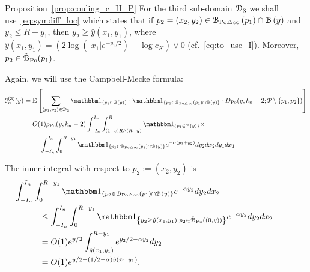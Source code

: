 \begin{proofof}{Proposition~\ref{prop:couling_c_H_P}}
For the third sub-domain $\mathcal{D}_{3}$ we shall use~\eqref{eq:symdiff_loc} which states that if 
$p_2=(x_2,y_2) \in {\mathcal B}_{{\mathrm{Po}} \bigtriangleup \infty}\left(p_1\right)\cap {\mathcal B}\left(y\right)$ and $y_2\leq R - y_1$, then 
$y_2 \geq \hat{y}(x_1,y_1)$, where $\hat{y}(x_1,y_1) = \left(2 \log(|x_1|e^{-y_1/2}) - \log c_K \right) \vee 0$ (cf.~\eqref{eq:to_use_I}). Moreover, $p_2 \in \check{{\mathcal B}}_{{\mathrm{Po}}}(p_1)$.


Again, we will use the Campbell-Mecke formula: 
\begin{align*}
	\mathcal{I}_n^{(3)}(y) &= \Exp { \sum_{(p_1,p_2)  \in \dom{3}} 
		\ind{p_1 \in \BallHyp{y}} \cdot \ind{p_2 \in \BallSym{p_1} \cap \BallHyp{y}}
		\cdot D_{\Po} (y,k_n-2;\Pcal \setminus \{ p_1, p_2\})} \\
	&= O(1) \rho_{\Po}(y,k_n-2) \int_{-I_n}^{I_n} \int_{(1-\eps) R \wedge (R-y)}^{R} \ind{p_1 \in \BallHyp{y}}
		\times\\
	&\hspace{25pt} \int_{-I_n}^{I_n} \int_{0}^{R-y_1} 
		\ind{p_2 \in \BallSym{p_1} \cap \BallHyp{y}} 
		e^{-\alpha(y_1 + y_2)} dy_2 dx_2 dy_1 dx_1 \\
\end{align*}

The inner integral with respect to $p_2 := (x_2,y_2)$ is 
\begin{align*}
	&\hspace{-30pt} \int_{-I_n}^{I_n} \int_{0}^{R - y_1}  \ind{p_2 \in \BallSym{p_1}\cap \BallHyp{y}}  
		e^{-\alpha y_2} dy_2 dx_2\\
	&\leq \int_{-I_n}^{I_n} \int_{0}^{R-y_1}  \ind{y_2 \geq \hat{y}(x_1,y_1), p_2 \in \FatBallHyp{(0,y)}}  
		e^{-\alpha y_2} dy_2 dx_2 \\
	&= O(1) e^{y/2} \int_{\hat{y}(x_1,y_1)}^{R - y_1} e^{y_2/2 - \alpha y_2} dy_2 \\
	&= O(1) e^{y/2 + (1/2 -\alpha) \hat{y}(x_1,y_1)}.
\end{align*}


\end{proofof}
